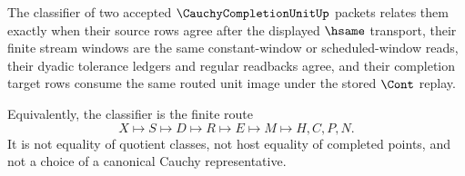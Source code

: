 \begin{definition}
\label{def:cauchy-completion-unit-classifier}
The classifier of two accepted $\CauchyCompletionUnitUp$ packets relates them exactly when their source rows agree after the displayed $\hsame$ transport, their finite stream windows are the same constant-window or scheduled-window reads, their dyadic tolerance ledgers and regular readbacks agree, and their completion target rows consume the same routed unit image under the stored $\Cont$ replay.

Equivalently, the classifier is the finite route
$$
X\longmapsto S\longmapsto D\longmapsto R\longmapsto E\longmapsto M\longmapsto H,C,P,N .
$$
It is not equality of quotient classes, not host equality of completed points, and not a choice of a canonical Cauchy representative.
\end{definition}

